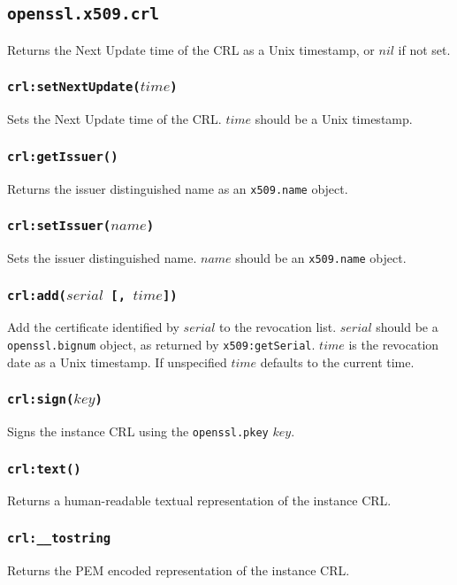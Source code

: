 \documentclass[11pt, oneside]{memoir}
\newcommand*{\fn}[1]{\texttt{#1}\xspace}
\newcommand*{\module}[1]{\texttt{#1}\xspace}
\newcounter{toccols}
\newenvironment{Module}[1]{
	\subsection{\texttt{#1}}
	\addtocontents{toc}{
		\protect\begin{multicols}{\value{toccols}}
	}
}{
	\addtocontents{toc}{\protect\end{multicols}}
}
\begin{document}
\begin{Module}{openssl.x509.crl}
Returns the Next Update time of the CRL as a Unix timestamp, or $nil$ if not set.

\subsubsection[\fn{crl:setNextUpdate}]{\fn{crl:setNextUpdate($time$)}}

Sets the Next Update time of the CRL. $time$ should be a Unix timestamp.

\subsubsection[\fn{crl:getIssuer}]{\fn{crl:getIssuer()}}

Returns the issuer distinguished name as an \module{x509.name} object.

\subsubsection[\fn{crl:setIssuer}]{\fn{crl:setIssuer($name$)}}

Sets the issuer distinguished name. $name$ should be an \module{x509.name} object.

\subsubsection[\fn{crl:add}]{\fn{crl:add($serial$ [, $time$])}}

Add the certificate identified by $serial$ to the revocation list. $serial$ should be a \module{openssl.bignum} object, as returned by \fn{x509:getSerial}. $time$ is the revocation date as a Unix timestamp. If unspecified $time$ defaults to the current time.

\subsubsection[\fn{crl:sign}]{\fn{crl:sign($key$)}}

Signs the instance CRL using the \module{openssl.pkey} $key$.

\subsubsection[\fn{crl:text}]{\fn{crl:text()}}

Returns a human-readable textual representation of the instance CRL.

\subsubsection[\fn{crl:\_\_tostring}]{\fn{crl:\_\_tostring}}

Returns the PEM encoded representation of the instance CRL.

\end{Module}
\end{document}

